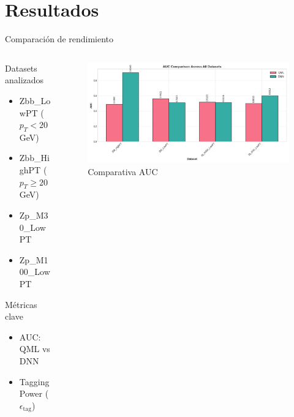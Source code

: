 \documentclass[aspectratio=43]{beamer}
\begin{document}
\section{Resultados}

\begin{frame}{Comparación de rendimiento}
  \begin{columns}
    \begin{column}{0.44\textwidth}
      \begin{block}{Datasets analizados}
        \begin{itemize}
          \item Zbb\_LowPT (\texorpdfstring{$p_T < 20$}{pT < 20} GeV)
          \item Zbb\_HighPT (\texorpdfstring{$p_T \geq 20$}{pT >= 20} GeV)
          \item Zp\_M30\_LowPT
          \item Zp\_M100\_LowPT
        \end{itemize}
      \end{block}
      \vspace{-0.2em}
      \begin{alertblock}{Métricas clave}
        \begin{itemize}
          \item AUC: QML vs DNN
          \item Tagging Power (\texorpdfstring{$\epsilon_{\text{tag}}$}{epsilon})
        \end{itemize}
      \end{alertblock}
    \end{column}
    \begin{column}{0.54\textwidth}
      \begin{figure}
        \includegraphics[width=\textwidth]{resumen_hmmm/auc_all_datasets.png}
        \caption{\small Comparativa AUC}
      \end{figure}
    \end{column}
  \end{columns}
\end{frame}
\end{document}
